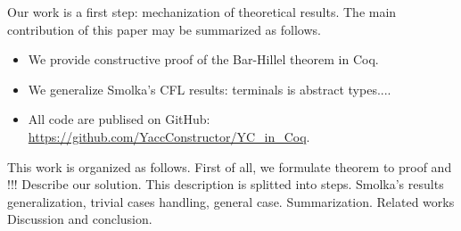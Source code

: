 Our work is a first step: mechanization of theoretical results.
The main contribution of this paper may be summarized as follows.
\begin{itemize}
\item We provide constructive proof of the Bar-Hillel theorem in Coq.
\item We generalize Smolka's CFL results: terminals is abstract types....
\item All code are publised on GitHub: \url{https://github.com/YaccConstructor/YC_in_Coq}.
\end{itemize}

This work is organized as follows. First of all, we formulate theorem to proof and !!!
Describe our solution. This description is splitted into steps.
Smolka's results generalization, trivial cases handling, general case. 
Summarization.
Related works
Discussion and conclusion.

